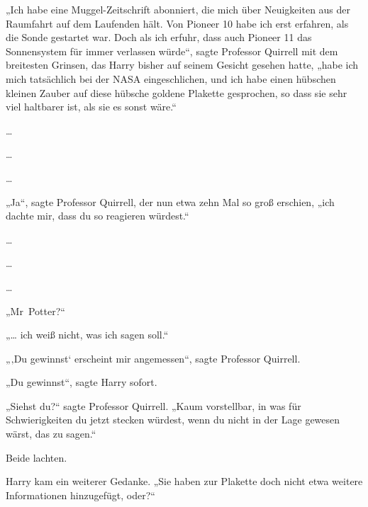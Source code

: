„Ich habe eine Muggel-Zeitschrift abonniert, die mich über Neuigkeiten aus der Raumfahrt auf dem Laufenden hält. Von Pioneer 10 habe ich erst erfahren, als die Sonde gestartet war. Doch als ich erfuhr, dass auch Pioneer 11 das Sonnensystem für immer verlassen würde“, sagte Professor Quirrell mit dem breitesten Grinsen, das Harry bisher auf seinem Gesicht gesehen hatte, „habe ich mich tatsächlich bei der NASA eingeschlichen, und ich habe einen hübschen kleinen Zauber auf diese hübsche goldene Plakette gesprochen, so dass sie sehr viel haltbarer ist, als sie es sonst wäre.“

…

…

…

„Ja“, sagte Professor Quirrell, der nun etwa zehn Mal so groß erschien, „ich dachte mir, dass du so reagieren würdest.“

…

…

…

„Mr~Potter?“

„… ich weiß nicht, was ich sagen soll.“

„‚Du gewinnst‘ erscheint mir angemessen“, sagte Professor Quirrell.

„Du gewinnst“, sagte Harry sofort.

„Siehst du?“ sagte Professor Quirrell.
„Kaum vorstellbar, in was für Schwierigkeiten du jetzt stecken würdest, wenn du nicht in der Lage gewesen wärst, das zu sagen.“

Beide lachten.

Harry kam ein weiterer Gedanke.
„Sie haben zur Plakette doch nicht etwa weitere Informationen hinzugefügt, oder?“

